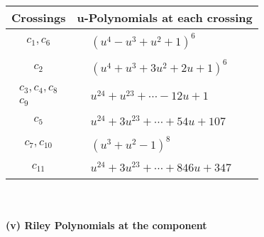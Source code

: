 \documentclass[1p]{elsarticle_modified}
\theoremstyle{definition}
\begin{document}
\begin{tabular}{m{50pt}|m{274pt}}
Crossings & \hspace{64pt}u-Polynomials at each crossing \\
\hline $$\begin{aligned}c_{1},c_{6}\end{aligned}$$&$\begin{aligned}
&(u^4- u^3+u^2+1)^6
\end{aligned}$\\
\hline $$\begin{aligned}c_{2}\end{aligned}$$&$\begin{aligned}
&(u^4+u^3+3 u^2+2 u+1)^6
\end{aligned}$\\
\hline $$\begin{aligned}c_{3},c_{4},c_{8}\\c_{9}\end{aligned}$$&$\begin{aligned}
&u^{24}+u^{23}+\cdots-12 u+1
\end{aligned}$\\
\hline $$\begin{aligned}c_{5}\end{aligned}$$&$\begin{aligned}
&u^{24}+3 u^{23}+\cdots+54 u+107
\end{aligned}$\\
\hline $$\begin{aligned}c_{7},c_{10}\end{aligned}$$&$\begin{aligned}
&(u^3+u^2-1)^8
\end{aligned}$\\
\hline $$\begin{aligned}c_{11}\end{aligned}$$&$\begin{aligned}
&u^{24}+3 u^{23}+\cdots+846 u+347
\end{aligned}$\\
\hline
\end{tabular}\\~\\
\newpage\renewcommand{\arraystretch}{1}
\flushleft \textbf{(v) Riley Polynomials at the component}\newline \\
\end{document}
